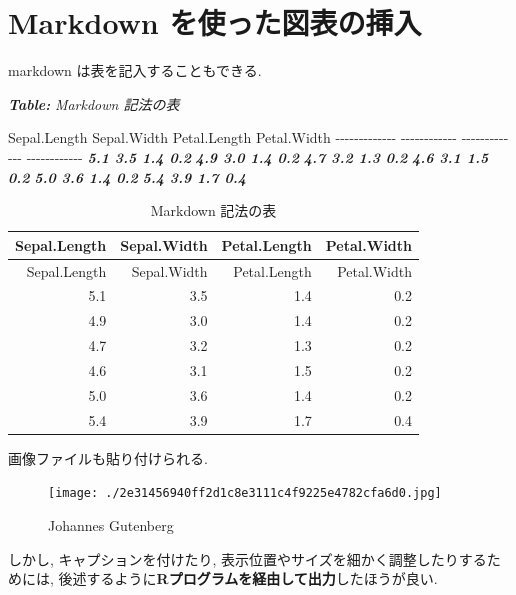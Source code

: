 \documentclass[
  nomag]{bxjsbook}
\newenvironment{Shaded}{\begin{snugshade}}{\end{snugshade}}
\newcommand{\AnnotationTok}[1]{\textcolor[rgb]{0.56,0.35,0.01}{\textbf{\textit{#1}}}}
\newcommand{\CommentTok}[1]{\textcolor[rgb]{0.56,0.35,0.01}{\textit{#1}}}
\newcommand{\InformationTok}[1]{\textcolor[rgb]{0.56,0.35,0.01}{\textbf{\textit{#1}}}}
\newcommand{\NormalTok}[1]{#1}
\theoremstyle{definition}
\theoremstyle{definition}
\theoremstyle{definition}
\theoremstyle{remark}
\begin{document}
\hypertarget{markdown-ux3092ux4f7fux3063ux305fux56f3ux8868ux306eux633fux5165}{%
\section{Markdown
を使った図表の挿入}\label{markdown-ux3092ux4f7fux3063ux305fux56f3ux8868ux306eux633fux5165}}

markdown は表を記入することもできる.

\begin{Shaded}
\begin{Highlighting}[]
\AnnotationTok{Table:}\CommentTok{ Markdown 記法の表}

\NormalTok{ Sepal.Length   Sepal.Width   Petal.Length   Petal.Width}
\NormalTok{{-}{-}{-}{-}{-}{-}{-}{-}{-}{-}{-}{-}{-}  {-}{-}{-}{-}{-}{-}{-}{-}{-}{-}{-}{-}  {-}{-}{-}{-}{-}{-}{-}{-}{-}{-}{-}{-}{-}  {-}{-}{-}{-}{-}{-}{-}{-}{-}{-}{-}{-}}
\InformationTok{          5.1           3.5            1.4           0.2}
\InformationTok{          4.9           3.0            1.4           0.2}
\InformationTok{          4.7           3.2            1.3           0.2}
\InformationTok{          4.6           3.1            1.5           0.2}
\InformationTok{          5.0           3.6            1.4           0.2}
\InformationTok{          5.4           3.9            1.7           0.4}
\end{Highlighting}
\end{Shaded}

\begin{longtable}[]{@{}rrrr@{}}
\caption{Markdown 記法の表}\tabularnewline
\toprule
Sepal.Length & Sepal.Width & Petal.Length & Petal.Width\tabularnewline
\midrule
\endfirsthead
\toprule
Sepal.Length & Sepal.Width & Petal.Length & Petal.Width\tabularnewline
\midrule
\endhead
5.1 & 3.5 & 1.4 & 0.2\tabularnewline
4.9 & 3.0 & 1.4 & 0.2\tabularnewline
4.7 & 3.2 & 1.3 & 0.2\tabularnewline
4.6 & 3.1 & 1.5 & 0.2\tabularnewline
5.0 & 3.6 & 1.4 & 0.2\tabularnewline
5.4 & 3.9 & 1.7 & 0.4\tabularnewline
\bottomrule
\end{longtable}

画像ファイルも貼り付けられる.

\begin{figure}
\centering
\texttt{[image: ./2e31456940ff2d1c8e3111c4f9225e4782cfa6d0.jpg]}
\caption{Johannes Gutenberg}
\end{figure}

しかし, キャプションを付けたり,
表示位置やサイズを細かく調整したりするためには,
後述するように\textbf{Rプログラムを経由して出力}したほうが良い.
\end{document}
